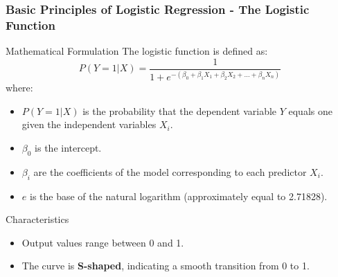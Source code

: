 \documentclass[aspectratio=169]{beamer}
\begin{document}
\begin{frame}[fragile]
    \frametitle{Basic Principles of Logistic Regression - The Logistic Function}
    \begin{block}{Mathematical Formulation}
        The logistic function is defined as:
        \begin{equation}
            P(Y=1 | X) = \frac{1}{1 + e^{-(\beta_0 + \beta_1X_1 + \beta_2X_2 + \ldots + \beta_nX_n)}}
        \end{equation}
        where:
        \begin{itemize}
            \item $P(Y=1 | X)$ is the probability that the dependent variable $Y$ equals one given the independent variables $X_i$.
            \item $\beta_0$ is the intercept.
            \item $\beta_i$ are the coefficients of the model corresponding to each predictor $X_i$.
            \item $e$ is the base of the natural logarithm (approximately equal to 2.71828).
        \end{itemize}
    \end{block}
    
    \begin{block}{Characteristics}
        \begin{itemize}
            \item Output values range between 0 and 1.
            \item The curve is \textbf{S-shaped}, indicating a smooth transition from 0 to 1.
        \end{itemize}
    \end{block}
\end{frame}
\end{document}
